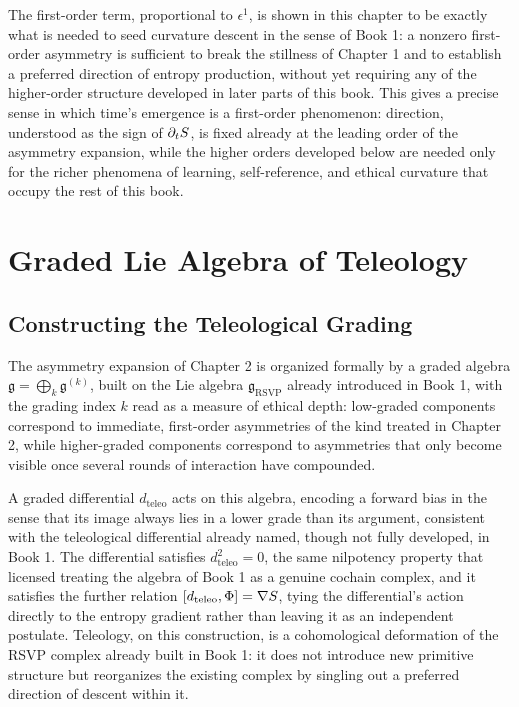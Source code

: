 The first-order term, proportional to $\epsilon^1$, is shown in this chapter to be exactly what is needed to seed curvature descent in the sense of Book 1: a nonzero first-order asymmetry is sufficient to break the stillness of Chapter 1 and to establish a preferred direction of entropy production, without yet requiring any of the higher-order structure developed in later parts of this book. This gives a precise sense in which time's emergence is a first-order phenomenon: direction, understood as the sign of $\partial_t S$, is fixed already at the leading order of the asymmetry expansion, while the higher orders developed below are needed only for the richer phenomena of learning, self-reference, and ethical curvature that occupy the rest of this book.

\part{Graded Lie Algebra of Teleology}

\chapter{Constructing the Teleological Grading}

The asymmetry expansion of Chapter 2 is organized formally by a graded algebra $\mathfrak{g} = \bigoplus_k \mathfrak{g}^{(k)}$, built on the Lie algebra $\mathfrak{g}_{\mathrm{RSVP}}$ already introduced in Book 1, with the grading index $k$ read as a measure of ethical depth: low-graded components correspond to immediate, first-order asymmetries of the kind treated in Chapter 2, while higher-graded components correspond to asymmetries that only become visible once several rounds of interaction have compounded.

A graded differential $d_{\mathrm{teleo}}$ acts on this algebra, encoding a forward bias in the sense that its image always lies in a lower grade than its argument, consistent with the teleological differential already named, though not fully developed, in Book 1. The differential satisfies $d_{\mathrm{teleo}}^2 = 0$, the same nilpotency property that licensed treating the algebra of Book 1 as a genuine cochain complex, and it satisfies the further relation $[d_{\mathrm{teleo}}, \Phi] = \nabla S$, tying the differential's action directly to the entropy gradient rather than leaving it as an independent postulate. Teleology, on this construction, is a cohomological deformation of the RSVP complex already built in Book 1: it does not introduce new primitive structure but reorganizes the existing complex by singling out a preferred direction of descent within it.

